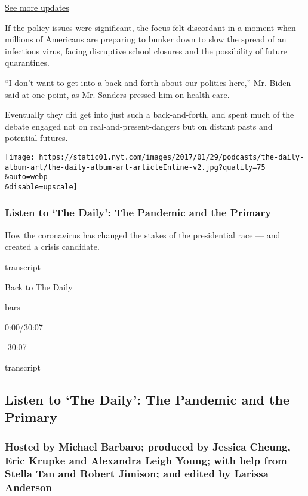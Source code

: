 \href{https://www.nytimes.com/2020/07/31/us/elections/biden-vs-trump.html?action=click\&pgtype=Article\&state=default\&region=MAIN_CONTENT_1\&context=storylines_live_updates}{See
more updates}

If the policy issues were significant, the focus felt discordant in a
moment when millions of Americans are preparing to bunker down to slow
the spread of an infectious virus, facing disruptive school closures and
the possibility of future quarantines.

``I don't want to get into a back and forth about our politics here,''
Mr. Biden said at one point, as Mr. Sanders pressed him on health care.

Eventually they did get into just such a back-and-forth, and spent much
of the debate engaged not on real-and-present-dangers but on distant
pasts and potential futures.

\texttt{[image: https://static01.nyt.com/images/2017/01/29/podcasts/the-daily-album-art/the-daily-album-art-articleInline-v2.jpg?quality=75\\\&auto=webp\\\&disable=upscale]}

\hypertarget{listen-to-the-daily-the-pandemic-and-the-primary}{%
\subsubsection{Listen to `The Daily': The Pandemic and the
Primary}\label{listen-to-the-daily-the-pandemic-and-the-primary}}

How the coronavirus has changed the stakes of the presidential race ---
and created a crisis candidate.

transcript

Back to The Daily

bars

0:00/30:07

-30:07

transcript

\hypertarget{listen-to-the-daily-the-pandemic-and-the-primary-1}{%
\subsection{Listen to `The Daily': The Pandemic and the
Primary}\label{listen-to-the-daily-the-pandemic-and-the-primary-1}}

\hypertarget{hosted-by-michael-barbaro-produced-by-jessica-cheung-eric-krupke-and-alexandra-leigh-young-with-help-from-stella-tan-and-robert-jimison-and-edited-by-larissa-anderson}{%
\subsubsection{Hosted by Michael Barbaro; produced by Jessica Cheung,
Eric Krupke and Alexandra Leigh Young; with help from Stella Tan and
Robert Jimison; and edited by Larissa
Anderson}\label{hosted-by-michael-barbaro-produced-by-jessica-cheung-eric-krupke-and-alexandra-leigh-young-with-help-from-stella-tan-and-robert-jimison-and-edited-by-larissa-anderson}}

